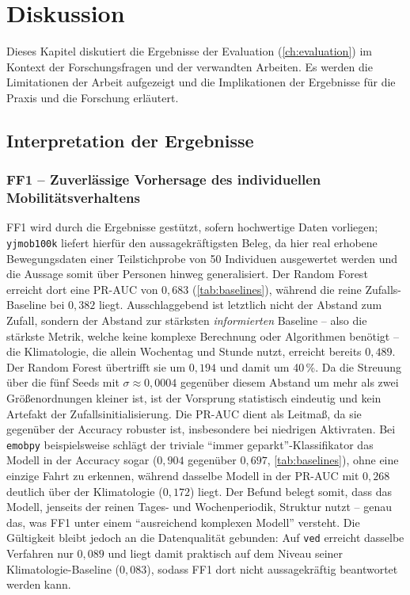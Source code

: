 \chapter{Diskussion}
\label{ch:diskussion}

Dieses Kapitel diskutiert die Ergebnisse der Evaluation (\cref{ch:evaluation}) im Kontext der Forschungsfragen und der verwandten Arbeiten. Es werden die Limitationen der Arbeit aufgezeigt und die Implikationen der Ergebnisse für die Praxis und die Forschung erläutert.

\section{Interpretation der Ergebnisse}
\label{sec:interpretation}

\subsection{FF1 -- Zuverlässige Vorhersage des individuellen Mobilitätsverhaltens} 

FF1 wird durch die Ergebnisse gestützt, sofern hochwertige Daten vorliegen; \\\texttt{yjmob100k} liefert hierfür den aussagekräftigsten Beleg, da hier real erhobene Bewegungsdaten einer Teilstichprobe von 50 Individuen ausgewertet werden und die Aussage somit über Personen hinweg generalisiert. Der Random Forest erreicht dort eine PR-AUC von $0,683$ (\cref{tab:baselines}), während die reine Zufalls-Baseline bei $0,382$ liegt. Ausschlaggebend ist letztlich nicht der Abstand zum Zufall, sondern der Abstand zur stärksten \emph{informierten} Baseline -- also die stärkste Metrik, welche keine komplexe Berechnung oder Algorithmen benötigt -- die Klimatologie, die allein Wochentag und Stunde nutzt, erreicht bereits $0,489$. Der Random Forest übertrifft sie um $0,194$ und damit um 40\,\%. Da die Streuung über die fünf Seeds mit $\sigma \approx 0,0004$ gegenüber diesem Abstand um mehr als zwei Größenordnungen kleiner ist, ist der Vorsprung statistisch eindeutig und kein Artefakt der Zufallsinitialisierung. Die PR-AUC dient als Leitmaß, da sie gegenüber der Accuracy robuster ist, insbesondere bei niedrigen Aktivraten. Bei \texttt{emobpy} beispielsweise schlägt der triviale \enquote{immer geparkt}-Klassifikator das Modell in der Accuracy sogar ($0,904$ gegenüber $0,697$, \cref{tab:baselines}), ohne eine einzige Fahrt zu erkennen, während dasselbe Modell in der PR-AUC mit $0,268$ deutlich über der Klimatologie ($0,172$) liegt. Der Befund belegt somit, dass das Modell, jenseits der reinen Tages- und Wochenperiodik, Struktur nutzt -- genau das, was FF1 unter einem \enquote{ausreichend komplexen Modell} versteht. Die Gültigkeit bleibt jedoch an die Datenqualität gebunden: Auf \texttt{ved} erreicht dasselbe Verfahren nur $0,089$ und liegt damit praktisch auf dem Niveau seiner Klimatologie-Baseline ($0,083$), sodass FF1 dort nicht aussagekräftig beantwortet werden kann.

